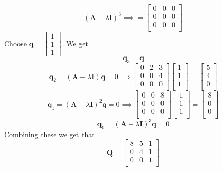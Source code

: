 \documentclass{article}
\begin{document}
\begin{enumerate}[a)]
$$(\mathbf{A} - \lambda\mathbf{I})^3
\implies
=
\begin{bmatrix}
0 & 0 & 0 \\
0 & 0 & 0 \\
0 & 0 & 0 \\
\end{bmatrix}
$$
Choose $\mathbf{q} = \begin{bmatrix} 1 \\ 1 \\ 1 \end{bmatrix}$. We get
$$
\mathbf{q}_3 = \mathbf{q}
$$
$$
\mathbf{q}_2 = (\mathbf{A} -\lambda\mathbf{I})\mathbf{q} = 0 \implies
\begin{bmatrix}
0 & 2 & 3 \\
0 & 0 & 4 \\
0 & 0 & 0 \\
\end{bmatrix}
\begin{bmatrix}
1\\
1\\
1\\
\end{bmatrix}
=
\begin{bmatrix}
5\\
4\\
0\\
\end{bmatrix}
$$
$$
\mathbf{q}_1 = (\mathbf{A} -\lambda\mathbf{I})^2\mathbf{q} = 0 \implies
\begin{bmatrix}
0 & 0 & 8 \\
0 & 0 & 0 \\
0 & 0 & 0 \\
\end{bmatrix}
\begin{bmatrix}
1\\
1\\
1\\
\end{bmatrix}
=
\begin{bmatrix}
8\\
0\\
0\\
\end{bmatrix}
$$
$$
\mathbf{q}_0 = (\mathbf{A} -\lambda\mathbf{I})^3\mathbf{q} = 0
$$
Combining these we get that
$$
\mathbf{Q}
=
\begin{bmatrix}
8 & 5 & 1 \\
0 & 4 & 1 \\
0 & 0 & 1 \\
\end{bmatrix}
$$


\end{enumerate}
\end{document}
